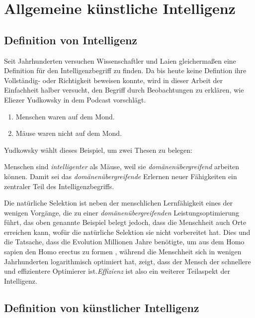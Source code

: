 \chapter{Allgemeine künstliche Intelligenz}
\section{Definition von Intelligenz}
Seit Jahrhunderten versuchen Wissenschaftler und Laien gleichermaßen eine Definition für den Intelligenzbegriff zu finden. Da bis heute keine Defintion ihre Vollständig- oder Richtigkeit beweisen konnte, wird in dieser Arbeit der Einfachheit halber versucht, den Begriff durch Beobachtungen zu erklären, wie Eliezer Yudkowsky in dem Podcast  vorschlägt.
\begin{enumerate}
\item Menschen waren auf dem Mond.
\item Mäuse waren nicht auf dem Mond.
\end{enumerate}
Yudkowsky wählt dieses Beispiel, um zwei Thesen zu belegen:

Menschen sind \emph{intelligenter} als Mäuse, weil sie \emph{domänenübergreifend} arbeiten können. Damit sei das \emph{domänenübergreifende} Erlernen neuer Fähigkeiten ein zentraler Teil des Intelligenzbegriffs.


Die natürliche Selektion ist neben der menschlichen Lernfähigkeit eines der wenigen Vorgänge, die zu einer \emph{domänenübergreifenden} Leistungsoptimierung führt, das oben genannte Beispiel belegt jedoch, dass die Menschheit auch Orte erreichen kann, wofür die natürliche Selektion sie nicht vorbereitet hat. Dies und die Tatsache, dass die Evolution Millionen Jahre benötigte, um aus dem Homo sapien den Homo erectus zu formen , während die Menschheit sich in wenigen Jahrhunderten logarithmisch optimiert hat, zeigt, dass der Mensch der schnellere und effizientere Optimierer ist.\emph{Effizienz} ist also ein weiterer Teilaspekt der Intelligenz.

\section{Definition von künstlicher Intelligenz}

